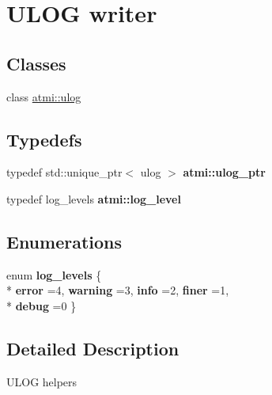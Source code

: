 \hypertarget{group__logging}{}\section{U\+L\+OG writer}
\label{group__logging}
\subsection*{Classes}
\begin{DoxyCompactItemize}
\item 
class \hyperlink{classatmi_1_1ulog}{atmi\+::ulog}
\end{DoxyCompactItemize}
\subsection*{Typedefs}
\begin{DoxyCompactItemize}
\item 
typedef std\+::unique\+\_\+ptr$<$ ulog $>$ {\bfseries atmi\+::ulog\+\_\+ptr}\hypertarget{group__logging_gaa0869c7a6b1f7846685e2454b70b9e7a}{}\label{group__logging_gaa0869c7a6b1f7846685e2454b70b9e7a}

\item 
typedef log\+\_\+levels {\bfseries atmi\+::log\+\_\+level}\hypertarget{group__logging_ga74d2cbe55d42a8a309e5535678fd9db3}{}\label{group__logging_ga74d2cbe55d42a8a309e5535678fd9db3}

\end{DoxyCompactItemize}
\subsection*{Enumerations}
\begin{DoxyCompactItemize}
\item 
enum {\bfseries log\+\_\+levels} \{ \\*
{\bfseries error} =4, 
{\bfseries warning} =3, 
{\bfseries info} =2, 
{\bfseries finer} =1, 
\\*
{\bfseries debug} =0
 \}\hypertarget{group__logging_gaf9bdc466e66896621125b81d022264ca}{}\label{group__logging_gaf9bdc466e66896621125b81d022264ca}

\end{DoxyCompactItemize}


\subsection{Detailed Description}
U\+L\+OG helpers 
